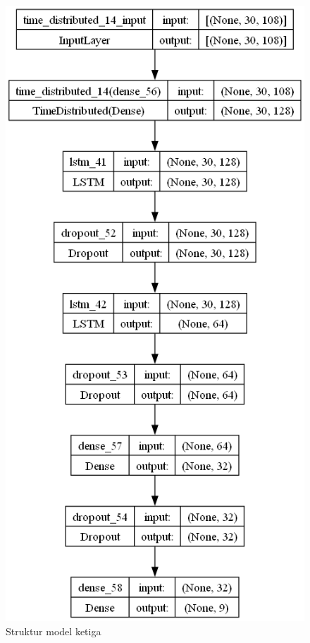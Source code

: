 \begin{figure}[H]
  \centering

  \includegraphics[scale=0.6]{gambar/bab4-uji-model-best-model.png}

  \caption{Struktur model ketiga}
  \label{fig:model3-struktur}
\end{figure}

